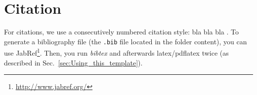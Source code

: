 \section{Citation} \label{sec:Citation}
For citations, we use a consecutively numbered citation style: bla \cite{latex} bla \cite{Koschi2017a, Althoff2017a} bla \cite{Paden2016}.
To generate a bibliography file (the \texttt{.bib} file located in the folder content), you can use JabRef\footnote{\url{http://www.jabref.org/}}.
Then, you run \textit{bibtex} and afterwards latex/pdflatex twice (as described in Sec.~\ref{sec:Using_this_template}).
